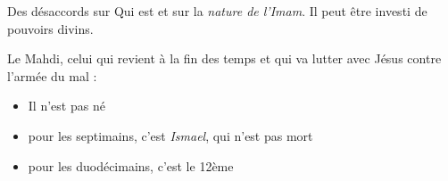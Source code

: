 \begin{Synthesis}
Des désaccords sur Qui est \imam et sur la \textit{nature de l'Imam}. Il peut être investi de pouvoirs divins.
\end{Synthesis}

\begin{Def}[Mahdi]
Le Mahdi, celui qui revient à la fin des temps et qui va lutter avec Jésus contre l'armée du mal :
\begin{itemize}
\item Il n'est pas né
\item pour les septimains, c'est \textit{Ismael}, qui n'est pas mort
\item pour les duodécimains, c'est le 12ème \imam
\end{itemize}
\end{Def}
